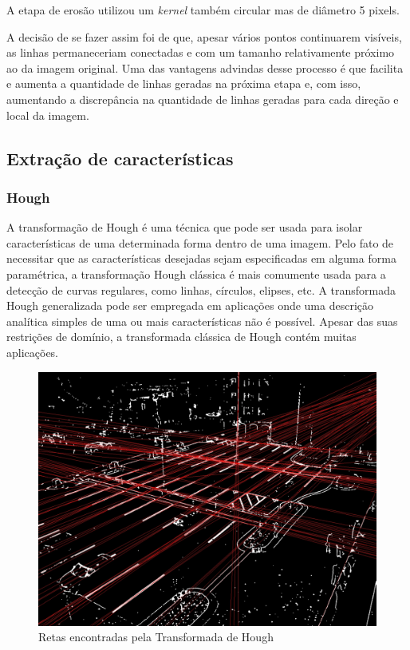 \documentclass[10pt,twocolumn,letterpaper]{article}
\begin{document}
	A etapa de erosão utilizou um \emph{kernel} também circular mas de diâmetro 5 pixels.
	
	A decisão de se fazer assim foi de que, apesar vários pontos continuarem visíveis, as linhas
permaneceriam conectadas e com um tamanho relativamente próximo ao da imagem original. Uma
das vantagens advindas desse processo é que facilita e aumenta a quantidade de linhas geradas
na próxima etapa e, com isso, aumentando a discrepância na quantidade de linhas geradas para
cada direção e local da imagem.

\subsection{Extração de características}

\subsubsection{Hough}

	A transformação de Hough{\footnotesize \cite{hough}} é uma técnica que pode
ser usada para isolar características de uma determinada forma dentro de uma imagem.
Pelo fato de necessitar que as características desejadas sejam especificadas em alguma
forma paramétrica, a transformação Hough clássica é mais comumente usada para a
detecção de curvas regulares, como linhas, círculos, elipses, etc. A transformada Hough
generalizada pode ser empregada em aplicações onde uma descrição analítica simples
de uma ou mais características não é possível. Apesar das suas restrições de domínio,
a transformada clássica de Hough contém muitas aplicações.

\begin{figure}[!htb]
\centering
\includegraphics[scale=0.15]{hough-linhas.jpg}
\caption{Retas encontradas pela Transformada de Hough}
\label{fig:hough}
\end{figure}
\end{document}
